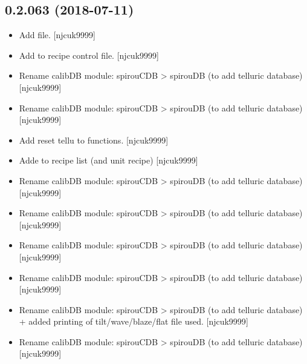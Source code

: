 \documentclass[a4paper,10pt,english]{report}
\begin{document}
\subsection{0.2.063 (2018-07-11)}
\label{\detokenize{misc/changelog:id396}}\begin{itemize}
\item {} 
Add  file. {[}njcuk9999{]}

\item {} 
Add  to recipe control file. {[}njcuk9999{]}

\item {} 
Rename calibDB module: spirouCDB \textendash{}\textgreater{} spirouDB (to add telluric
database) {[}njcuk9999{]}

\item {} 
Rename calibDB module: spirouCDB \textendash{}\textgreater{} spirouDB (to add telluric
database) {[}njcuk9999{]}

\item {} 
Add reset tellu to  functions. {[}njcuk9999{]}

\item {} 
Adde  to recipe list (and unit recipe) {[}njcuk9999{]}

\item {} 
Rename calibDB module: spirouCDB \textendash{}\textgreater{} spirouDB (to add telluric
database) {[}njcuk9999{]}

\item {} 
Rename calibDB module: spirouCDB \textendash{}\textgreater{} spirouDB (to add telluric
database) {[}njcuk9999{]}

\item {} 
Rename calibDB module: spirouCDB \textendash{}\textgreater{} spirouDB (to add telluric
database) {[}njcuk9999{]}

\item {} 
Rename calibDB module: spirouCDB \textendash{}\textgreater{} spirouDB (to add telluric
database) {[}njcuk9999{]}

\item {} 
Rename calibDB module: spirouCDB \textendash{}\textgreater{} spirouDB (to add telluric
database) + added printing of tilt/wave/blaze/flat file used.
{[}njcuk9999{]}

\item {} 
Rename calibDB module: spirouCDB \textendash{}\textgreater{} spirouDB (to add telluric
database) {[}njcuk9999{]}


\end{itemize}
\end{document}
